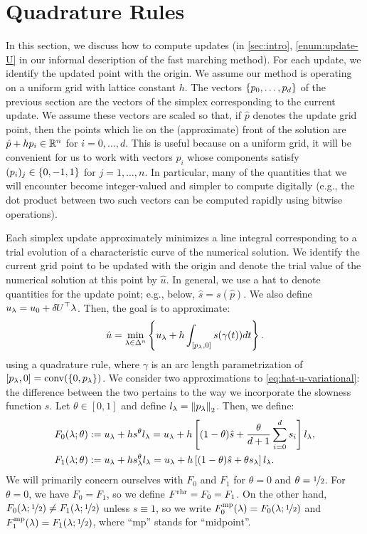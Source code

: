 \documentclass[eikonal.tex]{subfiles}
\begin{document}
\section{Quadrature Rules}

In this section, we discuss how to compute updates (in
\cref{sec:intro}, \cref{enum:update-U} in our informal description of
the fast marching method). For each update, we identify the updated
point with the origin. We assume our method is operating on a uniform
grid with lattice constant $h$. The vectors $\left\{p_0, \hdots, p_d\right\}$
of the previous section are the vectors of the simplex corresponding
to the current update. We assume these vectors are scaled so that, if
$\hat{p}$ denotes the update grid point, then the points which lie on
the (approximate) front of the solution are $\hat{p} + h p_i \in \mathbb{R}^n$
for $i = 0, \hdots, d$. This is useful because on a uniform grid, it
will be convenient for us to work with vectors $p_i$ whose components
satisfy $(p_i)_j \in \left\{0, -1, 1\right\}$ for $j = 1, \hdots, n$. In
particular, many of the quantities that we will encounter become
integer-valued and simpler to compute digitally (e.g., the dot product
between two such vectors can be computed rapidly using bitwise
operations).

Each simplex update approximately minimizes a line integral
corresponding to a trial evolution of a characteristic curve of the
numerical solution. We identify the current grid point to be updated
with the origin and denote the trial value of the numerical solution
at this point by $\hat{u}$. In general, we use a hat to denote
quantities for the update point; e.g., below, $\hat{s} =
s(\hat{p})$. We also define $u_\lambda = u_0 + {\delta \hspace{-0.09em} U}^\top
\lambda$. Then, the goal is to approximate:
\begin{equation}
  \hat{u} = \min_{\lambda \in \Delta^n} \left\{u_\lambda + h \int_{[p_\lambda, 0]} s(\gamma(t))dt\right\}.\label{eq:hat-u-variational}
\end{equation}
using a quadrature rule, where $\gamma$ is an arc length
parametrization of
$[p_\lambda, 0] = \operatorname{conv}(\left\{0, p_\lambda\right\})$. We
consider two approximations to \cref{eq:hat-u-variational}: the
difference between the two pertains to the way we incorporate the
slowness function $s$. Let $\theta \in [0, 1]$ and define
$l_\lambda = \left\|p_\lambda\right\|_2$. Then, we define:
\begin{align*}
  F_0(\lambda; \theta) &:= u_\lambda + h s^{\theta} l_\lambda = u_\lambda + h \left[(1-\theta)\hat{s} + \frac{\theta}{d + 1} \sum_{i=0}^d s_i\right] l_\lambda, \\
  F_1(\lambda; \theta) &:= u_\lambda + h s^{\theta}_\lambda l_\lambda = u_\lambda + h \left[(1-\theta)\hat{s} + \theta s_\lambda\right] l_\lambda.
\end{align*}
We will primarily concern ourselves with $F_0$ and $F_1$ for
$\theta = 0$ and $\theta = \nicefrac{1}{2}$. For $\theta = 0$, we have
$F_0 = F_1$, so we define $F^{\operatorname{rhr}} = F_0 = F_1$. On the other hand,
$F_0(\lambda;\nicefrac{1}{2}) \neq F_1(\lambda;\nicefrac{1}{2})$
unless $s \equiv 1$, so we write
$F_0^{\operatorname{mp}}(\lambda) = F_0(\lambda; \nicefrac{1}{2})$ and
$F_1^{\operatorname{mp}}(\lambda) = F_1(\lambda; \nicefrac{1}{2})$, where ``mp''
stands for ``midpoint''.
\end{document}
